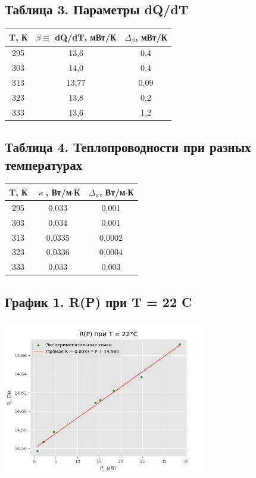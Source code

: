 \documentclass[15pt,a5paper,reqno]{article}
\renewcommand{\kappa}{\varkappa}
\begin{document}
    \subsection{Таблица 3. Параметры dQ/dT}
    \begin{center}
        \begin{tabular}{|c|c|c|}
            \hline
            T, К & $\beta\equiv$ dQ/dT, мВт/К & $\Delta_{\beta}$, мВт/К \\ \hline
            295 & 13,6  & 0,4  \\ \hline
            303 & 14,0  & 0,4  \\ \hline
            313 & 13,77 & 0,09 \\ \hline
            323 & 13,8  & 0,2  \\ \hline
            333 & 13,6  & 1,2  \\ \hline
        \end{tabular}
    \end{center}
    
    \subsection{Таблица 4. Теплопроводности при разных температурах}
    \begin{center}
        \begin{tabular}{|c|c|c|}
            \hline
            T, К & $\kappa$, Вт/м$\cdot$К & $\Delta_{\kappa}$, Вт/м$\cdot$К \\ \hline
            295 & 0,033  & 0,001 \\ \hline
            303 & 0,034  & 0,001 \\ \hline
            313 & 0,0335 & 0,0002 \\ \hline
            323 & 0,0336 & 0,0004 \\ \hline
            333 & 0,033  & 0,003 \\ \hline
        \end{tabular}
    \end{center}
    
    \newpage
    \subsection{График 1. R(P) при T = 22 \degree C}
    \begin{center}
        \centering
        \includegraphics[width = 9cm]{22.png}
    \end{center}
    
\end{document}
